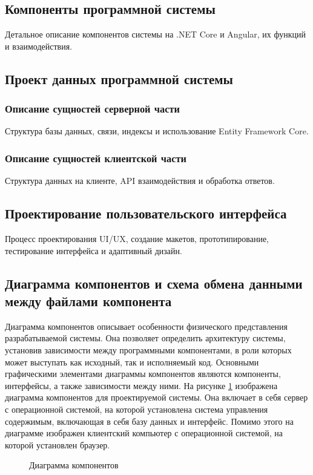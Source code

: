 \subsection{Компоненты программной системы}
Детальное описание компонентов системы на .NET Core и Angular, их функций и взаимодействия.

\subsection{Проект данных программной системы}
\subsubsection{Описание сущностей серверной части}
Структура базы данных, связи, индексы и использование Entity Framework Core.
\subsubsection{Описание сущностей клиентской части}
Структура данных на клиенте, API взаимодействия и обработка ответов.

\subsection{Проектирование пользовательского интерфейса}
Процесс проектирования UI/UX, создание макетов, прототипирование, тестирование интерфейса и адаптивный дизайн.

\subsection{Диаграмма компонентов и схема обмена данными между файлами компонента}

Диаграмма компонентов описывает особенности физического представления разрабатываемой системы. Она позволяет определить архитектуру системы, установив зависимости между программными компонентами, в роли которых может выступать как исходный, так и исполняемый код. Основными графическими элементами диаграммы компонентов являются компоненты, интерфейсы, а также зависимости между ними. На рисунке \ref{comp:image} изображена диаграмма компонентов для проектируемой системы. Она включает в себя сервер с операционной системой, на которой установлена система управления содержимым, включающая в себя базу данных и интерфейс. Помимо этого на диаграмме изображен клиентский компьютер с операционной системой, на которой установлен браузер.

\begin{figure}[ht]
\caption{Диаграмма компонентов}
\label{comp:image}
\end{figure}

